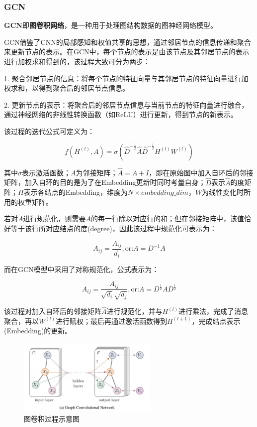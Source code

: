 \documentclass[hyperref,a4paper,UTF8]{ctexart}
\begin{document}
\subsubsection{GCN}
\textbf{GCN}即\textbf{图卷积网络}，是一种用于处理图结构数据的图神经网络模型。

GCN借鉴了CNN的局部感知和权值共享的思想，通过邻居节点的信息传递和聚合来更新节点的表示。在GCN中，每个节点的表示是由该节点及其邻居节点的表示进行加权求和得到的，该过程大致可分为两步：

1. 聚合邻居节点的信息：将每个节点的特征向量与其邻居节点的特征向量进行加权求和，以得到聚合后的邻居节点信息。

2. 更新节点的表示：将聚合后的邻居节点信息与当前节点的特征向量进行融合，通过神经网络的非线性转换函数（如ReLU）进行更新，得到节点的新表示。

该过程的迭代公式可定义为\cite{kipf2017semisupervised}：

$$f(H^{(l)}, A) = \sigma(\hat{D}^{-\frac{1}{2}}\hat{A}\hat{D}^{-\frac{1}{2}} H^{(l)}W^{(l)}) $$

其中$\sigma$表示激活函数；$A$为邻接矩阵；$\hat{A}=A+I$，即在原始图中加入自环后的邻接矩阵，加入自环的目的是为了在Embedding更新时同时考量自身；$\hat{D}$表示$\hat{A}$的度矩阵；$H$表示各结点的Embedding，维度为$N\times embedding\_dim$，$W$为线性变化时所用的权重矩阵。

若对$A$进行规范化，则需要$A$的每一行除以对应行的和；但在邻接矩阵中，该值恰好等于该行所对应结点的度(degree)，因此该过程中规范化可表示为：

$$A_{ij}=\frac{A_{ij}}{d_i},\text{or:}A=D^{-1}A$$

而在GCN模型中采用了对称规范化，公式表示为：

$$A_{ij}=\frac{A_{ij}}{\sqrt{d_i}\sqrt{d_j}},\text{or:}A=D^\frac{1}{2}AD^{\frac{1}{2}}$$

该过程对加入自环后的邻接矩阵$\hat{A}$进行规范化，并与$H^{(l)}$进行乘法，完成了消息聚合，再以$W^{(l)}$进行赋权；最后再通过激活函数得到$H^{(l+1)}$，完成结点表示(Embedding)的更新。

\begin{figure}[ht]
    \centering
    \includegraphics[width=0.6\textwidth]{fig/graph_conv.jpg}
    \caption{图卷积过程示意图}
    \label{fig:graph_conv}
\end{figure}
\end{document}
